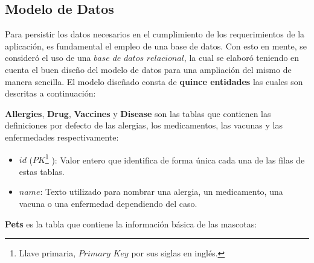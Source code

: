 \subsection{Modelo de Datos}

Para persistir los datos necesarios en el cumplimiento de los requerimientos de la aplicación, es fundamental el empleo de una base de datos. Con esto en mente, se consideró el uso de una $base$ $de$ $datos$ $relacional$, la cual se elaboró teniendo en cuenta el buen diseño del modelo de datos para una ampliación del mismo de manera sencilla. El modelo diseñado consta de \textbf{quince entidades} las cuales son descritas a continuación:

\textbf{Allergies}, \textbf{Drug}, \textbf{Vaccines} y \textbf{Disease} son las tablas que contienen las definiciones por defecto de las alergias, los medicamentos, las vacunas y las enfermedades respectivamente:

\begin{itemize}
\item	$id$ ($PK$\footnote{Llave primaria, $Primary$  $Key$ por sus siglas en inglés.} ): Valor entero que identifica de forma única cada una de las filas de estas tablas.
\item	$name$: Texto utilizado para nombrar una alergia, un medicamento, una vacuna o una enfermedad dependiendo del caso.

\end{itemize}

\textbf{Pets} es la tabla que contiene la información básica de las mascotas:

